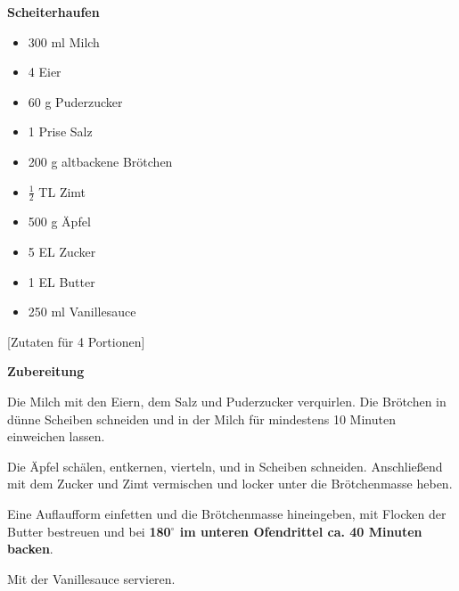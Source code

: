 

\parindent0pt	

\pagestyle{empty}


\textbf{\LARGE{Scheiterhaufen}}%

\hrulefill
\vspace*{\fill}
\begin{multicols}{2}	


\begin{itemize}
\item 300 ml Milch
\item 4 Eier
\item 60 g Puderzucker
\item 1 Prise Salz
\item 200 g altbackene Brötchen
\item $\frac{1}{2}$ TL Zimt
\item 500 g Äpfel
\item 5 EL Zucker
\item 1 EL Butter
\item 250 ml Vanillesauce
\end{itemize}
\end{multicols}
\vfill									%

\vspace{2cm}
%
\begin{center}
%
[Zutaten für 4 Portionen]%
\end{center}



\vfill
\newpage
\textbf{{\LARGE Zubereitung}}%

\hrulefill

\vspace*{\fill}
\begin{multicols}{2}

Die Milch mit den Eiern, dem Salz und Puderzucker verquirlen.\newline
Die Brötchen in dünne Scheiben schneiden und in der Milch für mindestens 10 Minuten
einweichen lassen.\newline

Die Äpfel schälen, entkernen, vierteln, und in Scheiben schneiden.\newline
Anschließend mit dem Zucker und Zimt vermischen und locker unter die Brötchenmasse heben.\newline

Eine Auflaufform einfetten und die Brötchenmasse hineingeben, mit Flocken der Butter bestreuen
und bei \textbf{180$^\circ$ im unteren Ofendrittel ca. 40 Minuten backen}.\newline

Mit der Vanillesauce servieren.



\end{multicols}
\vfill
